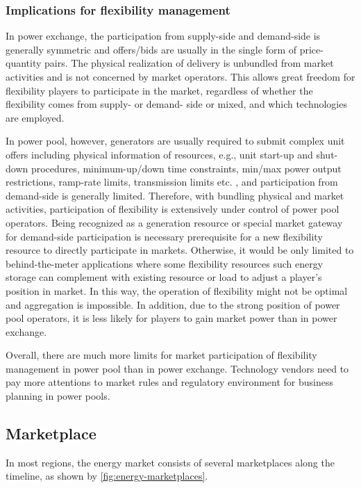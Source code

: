 \subsubsection{Implications for flexibility management}
In power exchange, the participation from supply-side and demand-side is generally symmetric and offers/bids are usually in the single form of price-quantity pairs. The physical realization of delivery is unbundled  from market activities and is not concerned by market operators. This allows great freedom for flexibility players to participate in the market, regardless of whether the flexibility comes from supply- or demand- side or mixed, and which technologies are employed. 

In power pool, however, generators are usually required to submit complex unit offers including physical information of resources, e.g., unit start-up and shut-down procedures, minimum-up/down time constraints, min/max power output restrictions, ramp-rate limits, transmission limits etc. \cite{Kardakos2013}, and participation from demand-side is generally limited. Therefore, with bundling physical and market activities, participation of flexibility is extensively under control of power pool operators. Being recognized as a generation resource or special market gateway for demand-side participation is necessary prerequisite for a new flexibility resource to directly participate in markets. Otherwise, it would be only limited to behind-the-meter applications where some flexibility resources such energy storage can complement with existing resource or load to adjust a player's position in market. In this way, the operation of flexibility might not be optimal and aggregation is impossible. In addition, due to the strong position of power pool operators, it is less likely for players to gain market power than in power exchange.

Overall, there are much more limits for market participation of flexibility management in power pool than in power exchange. Technology vendors need to pay more attentions to market rules and regulatory environment for business planning in power pools. 

\subsection{Marketplace}

In most regions, the energy market consists of several marketplaces along the timeline, as shown by \ref{fig:energy-marketplaces}.

